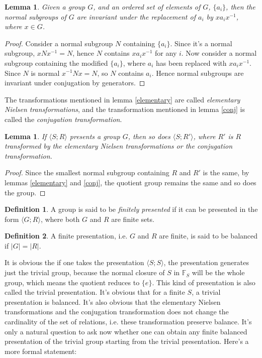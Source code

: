 \documentclass[12pt, titlepage]{article}
\newtheorem{lem}[thm]{Lemma}
\theoremstyle{definition}
\newtheorem{defn}{Definition}[section]
\begin{document}
\begin{lem}\label{conj}
Given a group $G$, and an ordered set of elements of $G$, $\{a_i\}$, then the normal subgroups of $G$ are invariant under the replacement of $a_i$ by $xa_ix^{-1}$, where $x \in G$.
\end{lem}

\begin{proof}
Consider a normal subgroup $N$ containing $\{a_i\}$. Since it's a normal subgroup, $xNx^{-1}=N$, hence $N$ contains $xa_ix^{-1}$ for any $i$. Now consider a normal subgroup containing the modified $\{a_i\}$, where $a_i$ has been replaced with $xa_ix^{-1}$. Since $N$ is normal $x^{-1}Nx=N$, so $N$ contains $a_i$. Hence normal subgroups are invariant under conjugation by generators.
\end{proof}

The transformations mentioned in lemma \autoref{elementary} are called \emph{elementary Nielsen transformations}, and the transformation mentioned in lemma \autoref{conj} is called the \emph{conjugation transformation}.

\begin{lem}
If $\langle S;R \rangle$ presents a group $G$, then so does $\langle S; R' \rangle$, where $R'$ is $R$ transformed by the elementary Nielsen transformations or the conjugation transformation.
\end{lem}

\begin{proof}
Since the smallest normal subgroup containing $R$ and $R'$ is the same, by lemmas \autoref{elementary} and \autoref{conj}, the quotient group remains the same and so does the group.
\end{proof}

\begin{defn}
A group is said to be \emph{finitely presented} if it can be presented in the form $\langle G;R\rangle$, where both $G$ and $R$ are finite sets.
\end{defn}

\begin{defn}
A finite presentation, i.e. $G$ and $R$ are finite, is said to be balanced if $|G|=|R|$.
\end{defn}

It is obvious the if one takes the presentation $\langle S;S \rangle$, the presentation generates just the trivial group, because the normal closure of $S$ in $\mathbb{F}_S$ will be the whole group, which means the quotient reduces to $\{e\}$. This kind of presentation is also called the trivial presentation. It's obvious that for a finite $S$, a trivial presentation is balanced. It's also obvious that the elementary Nielsen transformations and the conjugation transformation does not change the cardinality of the set of relations, i.e. these transformation preserve balance. It's only a natural question to ask now whether one can obtain any finite balanced presentation of the trivial group starting from the trivial presentation. Here's a more formal statement:
\end{document}
